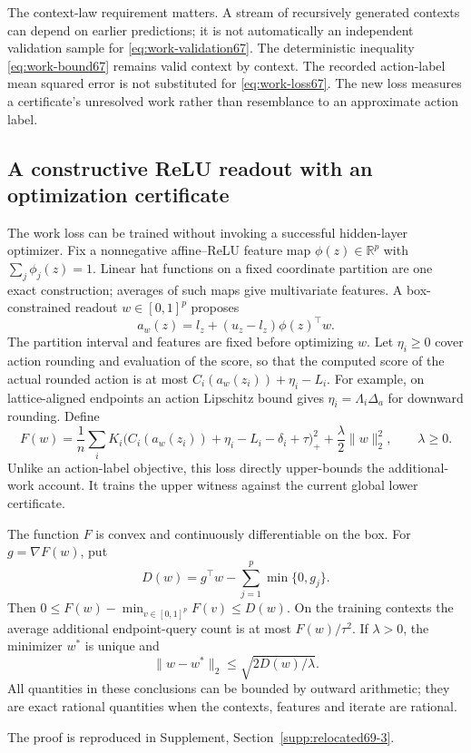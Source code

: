 The context-law requirement matters. A stream of recursively generated contexts can depend on earlier predictions; it is not automatically an independent validation sample for \eqref{eq:work-validation67}. The deterministic inequality \eqref{eq:work-bound67} remains valid context by context. The recorded action-label mean squared error is not substituted for \eqref{eq:work-loss67}. The new loss measures a certificate's unresolved work rather than resemblance to an approximate action label.

\subsection{A constructive ReLU readout with an optimization certificate}
The work loss can be trained without invoking a successful hidden-layer optimizer. Fix a nonnegative affine--ReLU feature map $\phi(z)\in\mathbb R^p$ with $\sum_j\phi_j(z)=1$. Linear hat functions on a fixed coordinate partition are one exact construction; averages of such maps give multivariate features. A box-constrained readout $w\in[0,1]^p$ proposes
\[
 a_w(z)=l_z+(u_z-l_z)\phi(z)^\top w.
\]
The partition interval and features are fixed before optimizing $w$. Let $\eta_i\ge0$ cover action rounding and evaluation of the score, so that the computed score of the actual rounded action is at most $C_i(a_w(z_i))+\eta_i-L_i$. For example, on lattice-aligned endpoints an action Lipschitz bound gives $\eta_i=\Lambda_i\Delta_a$ for downward rounding. Define
\begin{equation}\label{eq:readout-loss67}
 F(w)=\frac1n\sum_i K_i
 \bigl(C_i(a_w(z_i))+\eta_i-L_i-\delta_i+\tau\bigr)_+^2
                      +\frac\lambda2\|w\|_2^2,
 \qquad \lambda\ge0.
\end{equation}
Unlike an action-label objective, this loss directly upper-bounds the additional-work account. It trains the upper witness against the current global lower certificate.

\begin{proposition}\label{prop:readout67}
The function $F$ is convex and continuously differentiable on the box. For $g=\nabla F(w)$, put
\begin{equation}\label{eq:dual-gap67}
 D(w)=g^\top w-\sum_{j=1}^p\min\{0,g_j\}.
\end{equation}
Then $0\le F(w)-\min_{v\in[0,1]^p}F(v)\le D(w)$. On the training contexts the average additional endpoint-query count is at most $F(w)/\tau^2$. If $\lambda>0$, the minimizer $w^*$ is unique and
\[
 \|w-w^*\|_2\le\sqrt{2D(w)/\lambda}.
\]
All quantities in these conclusions can be bounded by outward arithmetic; they are exact rational quantities when the contexts, features and iterate are rational.
\end{proposition}
\noindent The proof is reproduced in Supplement, Section~\ref{supp:relocated69-3}.

